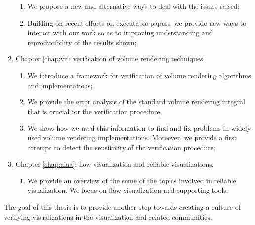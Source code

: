 \begin{enumerate}
\begin{enumerate}
\item We propose a new and alternative ways to deal with the issues raised;
\item Building on recent efforts on executable papers, we provide new ways to interact with our work so as to improving understanding and reproducibility of the results shown;
\end{enumerate}
\item Chapter \ref{chap:vr}: verification of volume rendering techniques.
\begin{enumerate}
\item We introduce a framework for verification of volume rendering algorithms and implementations;
\item We provide the error analysis of the standard volume rendering integral that is crucial for the verification procedure;
\item We show how we used this information to find and fix problems in widely used volume rendering  implementations. Moreover, we provide a first attempt to detect the sensitivity of the verification procedure;
\end{enumerate}
\item Chapter \ref{chap:aiaa}: flow visualization and reliable visualizations.
\begin{enumerate}
\item We provide an overview of the some of the topics involved in reliable visualization. We focus on flow visualization and supporting tools.
\end{enumerate}
\end{enumerate}
The goal of this thesis is to provide another step towards creating a culture of verifying visualizations in the visualization and related communities.

